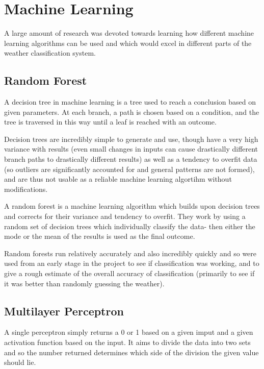 \documentclass[a4paper,12pt,twoside]{report}
\begin{document}
\section{Machine Learning}
A large amount of research was devoted towards learning how different machine learning algorithms can be used and which would excel in different parts of the weather classification system.

\subsection{Random Forest}
A decision tree in machine learning is a tree used to reach a conclusion based on given parameters. At each branch, a path is chosen based on a condition, and the tree is traversed in this way until a leaf is reached with an outcome. 

Decision trees are incredibly simple to generate and use, though have a very high variance with results (even small changes in inputs can cause drastically different branch paths to drastically different results) as well as a tendency to overfit data (so outliers are significantly accounted for and general patterns are not formed), and are thus not usable as a reliable machine learning algortihm without modifications.


A random forest is a machine learning algorithm which builds upon decision trees and corrects for their variance and tendency to overfit. They work by using a random set of decision trees which individually classify the data- then either the mode or the mean of the results is used as the final outcome.


Random forests run relatively accurately and also incredibly quickly and so were used from an early stage in the project to see if classification was working, and to give a rough estimate of the overall accuracy of classification (primarily to see if it was better than randomly guessing the weather).

\subsection{Multilayer Perceptron}
A single perceptron simply returns a 0 or 1 based on a given imput and a given activation function based on the input. It aims to divide the data into two sets and so the number returned determines which side of the division the given value should lie.
\end{document}
